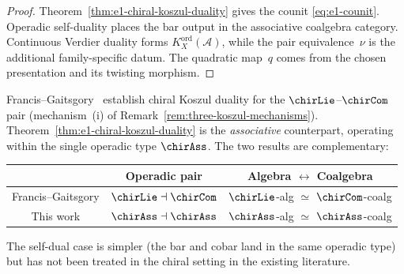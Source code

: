 \begin{proof}
Theorem~\ref{thm:e1-chiral-koszul-duality} gives the counit
\eqref{eq:e1-counit}.  Operadic self-duality places the bar output in
the associative coalgebra category.  Continuous Verdier duality forms
$K_X^{\mathrm{ord}}(\mathcal A)$, while the pair equivalence~$\nu$
is the additional family-specific datum.  The quadratic map~$q$
comes from the chosen presentation and its twisting morphism.
\end{proof}

\begin{remark}\label{rem:FG-comparison}
Francis--Gaitsgory~\cite{FG12} establish chiral Koszul duality for
the $\chirLie$--$\chirCom$ pair (mechanism~(i) of
Remark~\ref{rem:three-koszul-mechanisms}).
Theorem~\ref{thm:e1-chiral-koszul-duality} is the \emph{associative}
counterpart, operating within the single operadic type $\chirAss$.
The two results are complementary:
\begin{center}
\begin{tabular}{c|c|c}
& \textbf{Operadic pair} & \textbf{Algebra $\leftrightarrow$ Coalgebra} \\
\hline
Francis--Gaitsgory & $\chirLie \dashv \chirCom$ &
 $\chirLie$-alg $\simeq$ $\chirCom$-coalg \\
This work & $\chirAss \dashv \chirAss$ &
 $\chirAss$-alg $\simeq$ $\chirAss$-coalg
\end{tabular}
\end{center}
The self-dual case is simpler (the bar and cobar
land in the same operadic type) but has not been treated in the
chiral setting in the existing literature.
\end{remark}
